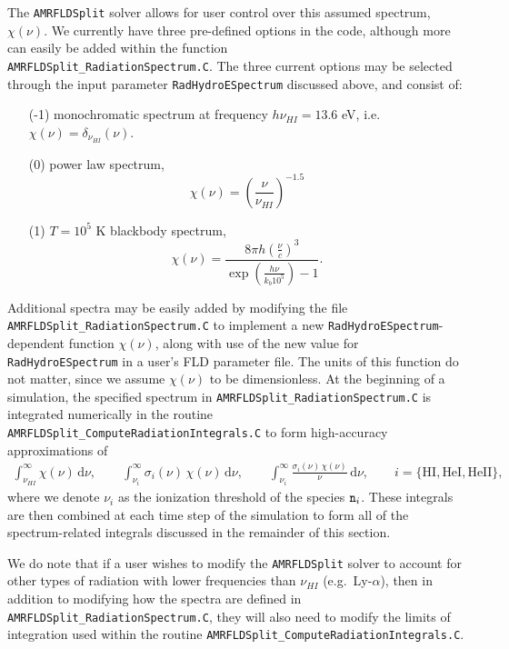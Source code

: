 \documentclass[letterpaper,10pt]{article}
\renewcommand{\(}{\left(}
\renewcommand{\)}{\right)}
\newcommand{\mn}{{\tt n}}
\begin{document}
The {\tt AMRFLDSplit} solver allows for user control over this assumed
spectrum, $\chi(\nu)$.  We currently have three pre-defined options in
the code, although more can easily be added within the function \\
{\tt AMRFLDSplit\_RadiationSpectrum.C}.  The three current options may
be selected through the input parameter {\tt RadHydroESpectrum}
discussed above, and consist of:
\begin{itemize}
\item[(-1)] monochromatic spectrum at frequency $h\nu_{HI} = 13.6$ eV, i.e.
  $\chi(\nu) = \delta_{\nu_{HI}}(\nu)$.  
\item[(0)] power law spectrum,
  \[
  \chi(\nu) = \left(\frac{\nu}{\nu_{HI}}\right)^{-1.5}
  \]
\item[(1)] $T=10^5$ K blackbody spectrum, 
  \[
  \chi(\nu) = \frac{8 \pi h
    \left(\frac{\nu}{c}\right)^3}{\exp\left(\frac{h\nu}{k_b 10^5}\right)-1}.
  \]
\end{itemize}
Additional spectra may be easily added by modifying the file 
{\tt AMRFLDSplit\_RadiationSpectrum.C} to implement a new 
{\tt RadHydroESpectrum}-dependent function $\chi(\nu)$, along with use
of the new value for {\tt RadHydroESpectrum} in a user's FLD parameter
file.  The units of this function do not matter, since we assume
$\chi(\nu)$ to be dimensionless.  At the beginning of a simulation,
the specified spectrum in {\tt AMRFLDSplit\_RadiationSpectrum.C} is
integrated numerically in the routine 
{\tt AMRFLDSplit\_ComputeRadiationIntegrals.C} to form high-accuracy
approximations of
\begin{align*}
  \int_{\nu_{HI}}^{\infty} \chi(\nu)\, \mathrm{d}\nu, \qquad
  \int_{\nu_i}^{\infty} \sigma_i(\nu)\, \chi(\nu)\, \mathrm{d}\nu,\qquad
  \int_{\nu_{i}}^{\infty} \frac{\sigma_{i}(\nu)\,\chi(\nu)}{\nu}\, \mathrm{d}\nu,
  \qquad i = \{\text{HI}, \text{HeI}, \text{HeII}\},
\end{align*}
where we denote $\nu_{i}$ as the ionization threshold of the species
$\mn_i$.  These integrals are then combined at each time step of the
simulation to form all of the spectrum-related integrals discussed in
the remainder of this section.

We do note that if a user wishes to modify the {\tt AMRFLDSplit}
solver to account for other types of radiation with lower frequencies
than $\nu_{HI}$ (e.g.~Ly-$\alpha$), then in addition to modifying how
the spectra are defined in {\tt AMRFLDSplit\_RadiationSpectrum.C},
they will also need to modify the limits of integration used within
the routine {\tt AMRFLDSplit\_ComputeRadiationIntegrals.C}.
\end{document}
